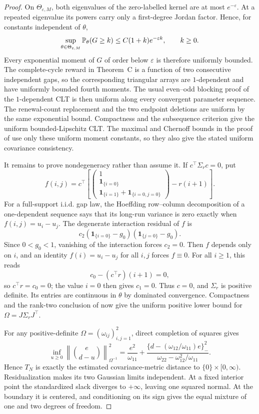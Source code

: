 \begin{proof}
On \(\Theta_{\varepsilon,M}\), both eigenvalues of the zero-labelled kernel
are at most \(e^{-\varepsilon}\).  At a repeated eigenvalue its powers carry
only a first-degree Jordan factor.  Hence, for constants independent of
\(\theta\),
\[
\sup_{\theta\in\Theta_{\varepsilon,M}}
\mathbb{P}_\theta(G\ge k)\le C(1+k)e^{-\varepsilon k},
\qquad k\ge0.
\]
Every exponential moment of \(G\) of order below \(\varepsilon\) is
therefore uniformly bounded.  The complete-cycle reward in Theorem~C is a
function of two consecutive independent gaps, so the corresponding
triangular arrays are \(1\)-dependent and have uniformly bounded fourth
moments.  The usual even--odd blocking proof of the \(1\)-dependent CLT is
then uniform along every convergent parameter sequence.  The renewal-count
replacement and the two endpoint deletions are uniform by the same
exponential bound.  Compactness and the subsequence criterion give the
uniform bounded-Lipschitz CLT.  The maximal and Chernoff bounds in the proof
of  use only these uniform
moment constants, so they also give the stated uniform covariance
consistency.

It remains to prove nondegeneracy rather than assume it.  If
\(c^\top\Sigma_rc=0\), put
\[
f(i,j)=c^\top
\left[
\begin{pmatrix}
1\\ \mathbf1_{\{i=0\}}\\
\mathbf1_{\{i=1\}}+\mathbf1_{\{i=0,j=0\}}
\end{pmatrix}
-r(i+1)
\right].
\]
For a full-support i.i.d. gap law, the Hoeffding row--column decomposition
of a one-dependent sequence says that its long-run variance is zero exactly
when \(f(i,j)=u_i-u_j\).  The degenerate interaction residual of \(f\) is
\[
c_2(\mathbf1_{\{i=0\}}-g_0)
(\mathbf1_{\{j=0\}}-g_0).
\]
Since \(0<g_0<1\), vanishing of the interaction forces \(c_2=0\).  Then
\(f\) depends only on \(i\), and an identity \(f(i)=u_i-u_j\) for all
\(i,j\) forces \(f\equiv0\).  For all \(i\ge1\), this reads
\[
c_0-(c^\top r)(i+1)=0,
\]
so \(c^\top r=c_0=0\); the value \(i=0\) then gives \(c_1=0\).  Thus
\(c=0\), and \(\Sigma_r\) is positive definite.  Its entries are continuous
in \(\theta\) by dominated convergence.  Compactness and the rank-two
conclusion of  now give the
uniform positive lower bound for \(\Omega=J\Sigma_rJ^\top\).

For any positive-definite
\(\Omega=(\omega_{ij})_{i,j=1}^2\), direct completion of squares gives
\[
\inf_{u\ge0}
\left\|\binom e{d-u}\right\|_{\Omega^{-1}}^2
=\frac{e^2}{\omega_{11}}
+\frac{\{d-(\omega_{12}/\omega_{11})e\}_{-}^2}
{\omega_{22}-\omega_{12}^2/\omega_{11}}.
\]
Hence \(T_N\) is exactly the estimated covariance-metric distance to
\(\{0\}\times[0,\infty)\).  Residualization makes its two Gaussian limits
independent.  At a fixed interior point the standardized slack diverges to
\(+\infty\), leaving one squared normal.  At the boundary it is centered,
and conditioning on its sign gives the equal mixture of one and two degrees
of freedom.


\end{proof}
